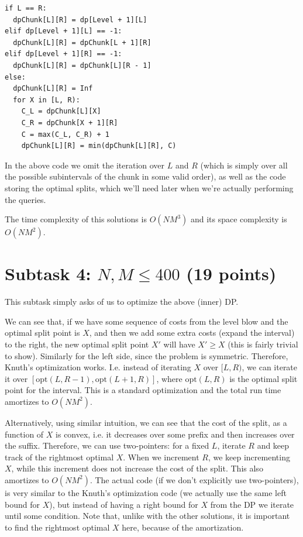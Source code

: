 \documentclass[12pt]{article}
\begin{document}
\begin{verbatim}
if L == R:
  dpChunk[L][R] = dp[Level + 1][L]
elif dp[Level + 1][L] == -1:
  dpChunk[L][R] = dpChunk[L + 1][R]
elif dp[Level + 1][R] == -1:
  dpChunk[L][R] = dpChunk[L][R - 1]
else:
  dpChunk[L][R] = Inf
  for X in [L, R):
    C_L = dpChunk[L][X]
    C_R = dpChunk[X + 1][R]
    C = max(C_L, C_R) + 1
    dpChunk[L][R] = min(dpChunk[L][R], C)
\end{verbatim}

\vspace{1em}

In the above code we omit the iteration over $L$ and $R$ (which is simply over all the possible subintervals of the chunk in some valid order), as well as the code storing the optimal splits, which we'll need later when we're actually performing the queries.

The time complexity of this solutions is $O(NM^3)$ and its space complexity is $O(NM^2)$.

\section*{Subtask 4: $N, M \leq 400$ (19 points)}

This subtask simply asks of us to optimize the above (inner) DP.

We can see that, if we have some sequence of costs from the level blow and the optimal split point is $X$, and then we add some extra costs (expand the interval) to the right, the new optimal split point $X'$ will have $X' \geq X$ (this is fairly trivial to show). Similarly for the left side, since the problem is symmetric. Therefore, Knuth's optimization works. I.e. instead of iterating $X$ over $[L, R)$, we can iterate it over $[\text{opt}(L, R - 1), \text{opt}(L + 1, R)]$, where $\text{opt}(L, R)$ is the optimal split point for the interval. This is a standard optimization and the total run time amortizes to $O(NM^2)$.

Alternatively, using similar intuition, we can see that the cost of the split, as a function of $X$ is convex, i.e. it decreases over some prefix and then increases over the suffix. Therefore, we can use two-pointers: for a fixed $L$, iterate $R$ and keep track of the rightmost optimal $X$. When we increment $R$, we keep incrementing $X$, while this increment does not increase the cost of the split. This also amortizes to $O(NM^2)$. The actual code (if we don't explicitly use two-pointers), is very similar to the Knuth's optimization code (we actually use the same left bound for $X$), but instead of having a right bound for $X$ from the DP we iterate until some condition. Note that, unlike with the other solutions, it is important to find the rightmost optimal $X$ here, because of the amortization.
\end{document}
